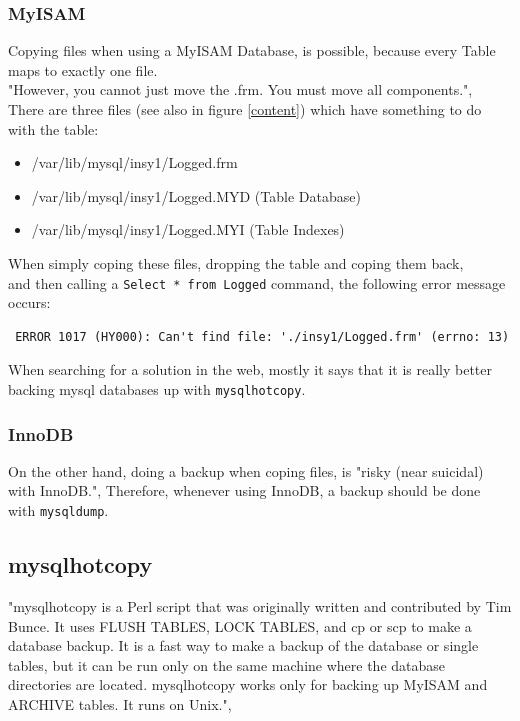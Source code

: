\documentclass[10pt]{article}
\begin{document}
\subsubsection{MyISAM}
Copying files when using a MyISAM Database, is possible, because every Table maps to exactly one file. \\
"However, you cannot just move the .frm. You must move all components.", \cite{so1} \\
There are three files (see also in figure \ref{content}) which have something to do with the table:
\begin{itemize}
\item /var/lib/mysql/insy1/Logged.frm
\item /var/lib/mysql/insy1/Logged.MYD (Table Database)
\item /var/lib/mysql/insy1/Logged.MYI (Table Indexes)
\end{itemize}
When simply coping these files, dropping the table and coping them back, \\ and then calling a \texttt{Select * from Logged} command, the following error message occurs:
\begin{lstlisting}
 ERROR 1017 (HY000): Can't find file: './insy1/Logged.frm' (errno: 13)
\end{lstlisting}
When searching for a solution in the web, mostly it says that it is really better backing mysql databases up with \texttt{mysqlhotcopy}.
\subsubsection{InnoDB}
On the other hand, doing a backup when coping files, is "risky (near suicidal) with InnoDB.",\cite{so1}
Therefore, whenever using InnoDB, a backup should be done with \texttt{mysqldump}.
\subsection{mysqlhotcopy}
"mysqlhotcopy is a Perl script that was originally written and contributed by Tim Bunce. It uses FLUSH TABLES, LOCK TABLES, and cp or scp to make a database backup. It is a fast way to make a backup of the database or single tables, but it can be run only on the same machine where the database directories are located. mysqlhotcopy works only for backing up MyISAM and ARCHIVE tables. It runs on Unix.",\cite{mysqlhotcopyman}
\end{document}
